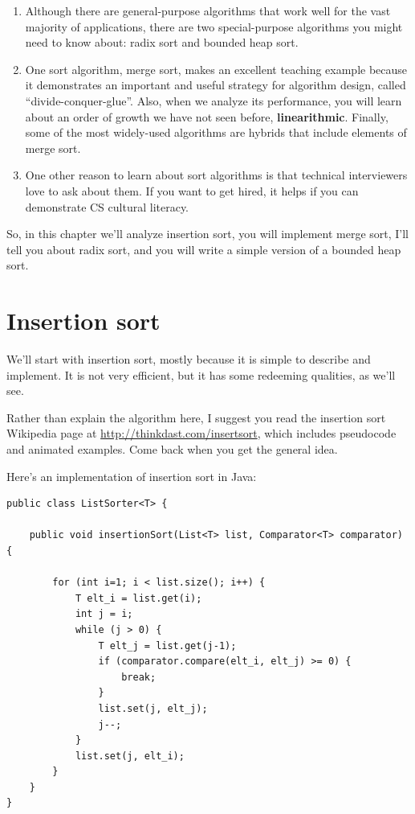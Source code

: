 \documentclass[12pt]{book}
\theoremstyle{exercise}
\begin{document}
\begin{enumerate}

\item
  Although there are general-purpose algorithms that work well for the
  vast majority of applications, there are two special-purpose
  algorithms you might need to know about: radix sort and bounded heap
  sort.

\item
  One sort algorithm, merge sort, makes an excellent teaching example
  because it demonstrates an important and useful strategy for
  algorithm design, called ``divide-conquer-glue''. Also, when we
  analyze its performance, you will learn about an order of growth we
  have not seen before, {\bf linearithmic}. Finally, some of the most
  widely-used algorithms are hybrids that include elements of merge
  sort.

\item
  One other reason to learn about sort algorithms is that technical
  interviewers love to ask about them. If you want to get hired, it
  helps if you can demonstrate CS cultural literacy.

\end{enumerate}

So, in this chapter we'll analyze insertion sort, you will implement merge
sort, I'll tell you about radix sort, and you will write a simple
version of a bounded heap sort.



\section{Insertion sort}
\label{insertion-sort}

We'll start with insertion sort, mostly because it is simple to describe
and implement. It is not very efficient, but it has some redeeming
qualities, as we'll see.


Rather than explain the algorithm here, I suggest you read the
insertion sort Wikipedia page at
\url{http://thinkdast.com/insertsort}, which includes
pseudocode and animated examples. Come back when you get the general
idea.

Here's an implementation of insertion sort in Java:

\begin{verbatim}
public class ListSorter<T> {

    public void insertionSort(List<T> list, Comparator<T> comparator) {

        for (int i=1; i < list.size(); i++) {
            T elt_i = list.get(i);
            int j = i;
            while (j > 0) {
                T elt_j = list.get(j-1);
                if (comparator.compare(elt_i, elt_j) >= 0) {
                    break;
                }
                list.set(j, elt_j);
                j--;
            }
            list.set(j, elt_i);
        }
    }
}
\end{verbatim}
\end{document}
